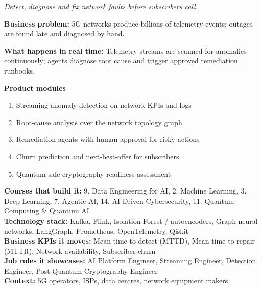 \documentclass[10pt,a4paper]{article}
\begin{document}
\begin{tcolorbox}[enhanced,breakable,colback=white,colframe=navy,boxrule=0.6pt,arc=2pt,title={\color{goldl}PRODUCT 6 \;|\; TELECOM \& NETWORK OPERATIONS\\\color{white}\large AIOps Self-Healing Network Platform},colbacktitle=navy,fonttitle=\small\bfseries]
{\small\itshape\color{muted}Detect, diagnose and fix network faults before subscribers call.}\par
\begin{tcolorbox}[colback=l1bg,colframe=l1bg,arc=2pt,borderline west={3pt}{0pt}{saffron},top=2pt,bottom=2pt]\small\textbf{Business problem:} 5G networks produce billions of telemetry events; outages are found late and diagnosed by hand.\end{tcolorbox}
\begin{tcolorbox}[colback=l3bg,colframe=l3bg,arc=2pt,borderline west={3pt}{0pt}{igreen},top=2pt,bottom=2pt]\small\textbf{What happens in real time:} Telemetry streams are scanned for anomalies continuously; agents diagnose root cause and trigger approved remediation runbooks.\end{tcolorbox}
{\small\textbf{Product modules}}\begin{enumerate}\small
\item Streaming anomaly detection on network KPIs and logs
\item Root-cause analysis over the network topology graph
\item Remediation agents with human approval for risky actions
\item Churn prediction and next-best-offer for subscribers
\item Quantum-safe cryptography readiness assessment
\end{enumerate}
{\small\textbf{Courses that build it:} 9. Data Engineering for AI, 2. Machine Learning, 3. Deep Learning, 7. Agentic AI, 14. AI-Driven Cybersecurity, 11. Quantum Computing \& Quantum AI\\\textbf{Technology stack:} Kafka, Flink, Isolation Forest / autoencoders, Graph neural networks, LangGraph, Prometheus, OpenTelemetry, Qiskit\\\textbf{Business KPIs it moves:} Mean time to detect (MTTD), Mean time to repair (MTTR), Network availability, Subscriber churn\\\textbf{Job roles it showcases:} AI Platform Engineer, Streaming Engineer, Detection Engineer, Post-Quantum Cryptography Engineer\\\textbf{Context:} 5G operators, ISPs, data centres, network equipment makers}
\end{tcolorbox}
\end{document}

